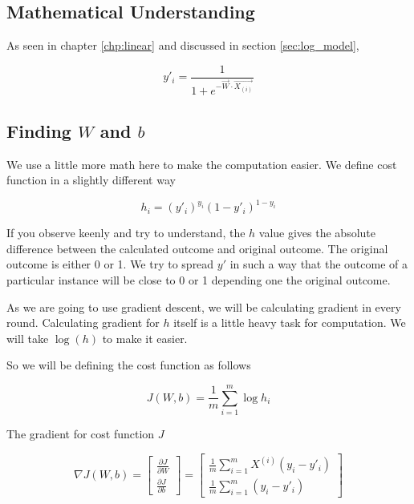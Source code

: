 \subsection{Mathematical Understanding}
As seen in chapter \ref{chp:linear} and discussed in section \ref{sec:log_model}, 

\begin{equation}
    y'_i = \frac{1}{1 + e^{-\vec{W} \cdot \vec{X_{(i)}}}}
\end{equation}

\subsection{Finding $W$ and $b$}
We use a little more math here to make the computation easier.
We define cost function in a slightly different way

\begin{equation}
    h_i = {(y'_i)}^{y_i}{(1-y'_i)}^{1-y_{i}}
\end{equation}

If you observe keenly and try to understand, the $h$ value gives the absolute difference between
the calculated outcome and original outcome. The original outcome is either 0 or 1. We try to spread $y'$
in such a way that the outcome of a particular instance will be close to 0 or 1 depending one
the original outcome.

As we are going to use gradient descent, we will be
calculating gradient in every round. Calculating gradient for $h$ itself is a little heavy task for computation.
We will take $\log(h)$ to make it easier.

So we will be defining the cost function as follows

\begin{equation}
    J(W,b) = \frac{1}{m} \sum_{i=1}^{m}\log{h_i}
\end{equation}

The gradient for cost function $J$

\begin{equation}
    \nabla J(W,b) = \begin{bmatrix}
        \frac{\partial J}{\partial W} \\
        \frac{\partial J}{\partial b}
    \end{bmatrix}
    = \begin{bmatrix}
        \frac{1}{m} \sum_{i=1}^{m}X^{(i)}(y_i - y'_i) \\
        \frac{1}{m} \sum_{i=1}^{m}(y_i - y'_i) 
    \end{bmatrix}
\end{equation}

